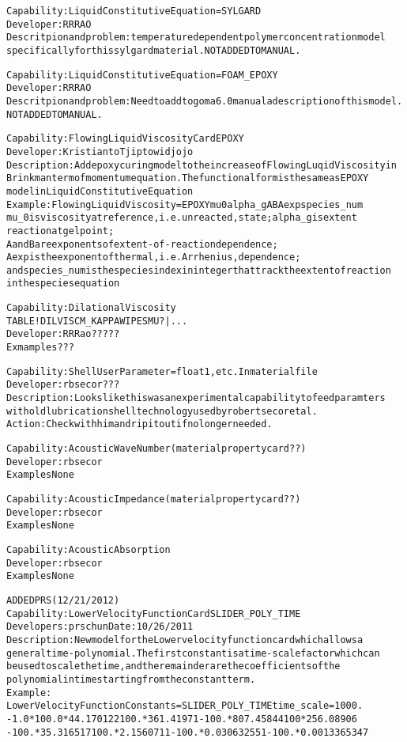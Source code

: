 \documentclass{article}
\begin{document}
\begin{alltt}
Capability:  Liquid Constitutive Equation = SYLGARD
Developer: RRRAO
Descritpion and problem: temperature dependent polymer concentration model
specifically for this sylgard material.    NOT ADDED TO MANUAL.    

Capability:  Liquid Constitutive Equation = FOAM_EPOXY
Developer: RRRAO
Descritpion and problem: Need to add to goma6.0 manual a description of this model. 
    NOT ADDED TO MANUAL.

Capability: FlowingLiquid Viscosity Card EPOXY
Developer: Kristianto Tjiptowidjojo
Description: Add epoxy curing model to the increase of FlowingLuqid Viscosity in
Brinkman term of momentum equation. The functional form is the same as EPOXY 
model in Liquid Constitutive Equation
Example: FlowingLiquid Viscosity = EPOXY {mu0} {alpha_g} {A} {B} {Aexp} {species_num}
mu_0 is viscosity at reference, i.e. unreacted, state; alpha_g is extent
reaction at gel point;
A and B are exponents of extent-of-reaction dependence;
Aexp is the exponent of thermal, i.e. Arrhenius, dependence;
and species_num is the species index in integer that track the extent of reaction
in the species equation

      

Capability: Dilational Viscosity 
{TABLE ! DILVISCM_KAPPAWIPESMU? | ...}
Developer: RRRao?????
Exmamples???  

Capability: Shell User Parameter = float 1, etc.   In material file
Developer: rbsecor???
Description:  Looks like this was an experimental capability to feed paramters
with old lubrication shell technology used by robert secor et al.   
Action: Check with him and rip it out if no longer needed.  

Capability: Acoustic Wave Number (material property card??)
Developer: rbsecor  
Examples None

Capability: Acoustic Impedance (material property card??)
Developer: rbsecor  
Examples None

Capability: Acoustic Absorption
Developer: rbsecor  
Examples None

ADDED PRS (12/21/2012)
Capability: Lower Velocity Function Card SLIDER_POLY_TIME
Developers: prschun Date: 10/26/2011
Description: New model for the Lower velocity function card which allows a
general time-polynomial.   The first constant is a time-scale factor which can
be used to scale the time, and the remainder are the coefficients of the
polynomial in time starting from the constant term.  
Example: 
Lower Velocity Function Constants = SLIDER_POLY_TIME   {time_scale = 1000.} 
{-1.0*100.0*44.170122} {100.*361.41971} {-100.*807.45844} {100*256.08906}  
{-100.*35.316517} {100.*2.1560711} {-100.*0.030632551} {-100.*0.0013365347}


\end{alltt}
\end{document}
